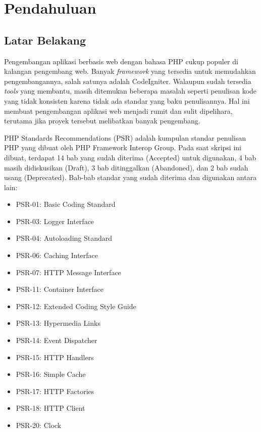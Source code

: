 \chapter{Pendahuluan}
\label{chap:intro}
   
\section{Latar Belakang}
\label{sec:label}

Pengembangan aplikasi berbasis web dengan bahasa PHP cukup populer di kalangan pengembang web. Banyak \textit{framework} yang tersedia untuk memudahkan pengembangannya, salah satunya adalah CodeIgniter. Walaupun sudah tersedia \textit{tools} yang membantu, masih ditemukan beberapa masalah seperti penulisan kode yang tidak konsisten karena tidak ada standar yang baku penulisannya. Hal ini membuat pengembangan aplikasi web menjadi rumit dan sulit dipelihara, terutama jika proyek tersebut melibatkan banyak pengembang.

PHP Standards Recommendations \cite{PSR} (PSR) adalah kumpulan standar penulisan PHP yang dibuat oleh PHP Framework Interop Group. Pada saat skripsi ini dibuat, terdapat 14 bab yang sudah diterima (Accepted) untuk digunakan, 4 bab masih didiskusikan (Draft), 3 bab ditinggalkan (Abandoned), dan 2 bab sudah usang (Deprecated). Bab-bab standar yang sudah diterima dan digunakan antara lain: 
\begin{itemize}
	\item PSR-01: Basic Coding Standard
	\item PSR-03: Logger Interface
	\item PSR-04: Autoloading Standard
	\item PSR-06: Caching Interface
	\item PSR-07: HTTP Message Interface
	\item PSR-11: Container Interface
	\item PSR-12: Extended Coding Style Guide
	\item PSR-13: Hypermedia Links
	\item PSR-14: Event Dispatcher
	\item PSR-15: HTTP Handlers
	\item PSR-16: Simple Cache
	\item PSR-17: HTTP Factories
	\item PSR-18: HTTP Client
	\item PSR-20: Clock
\end{itemize}


